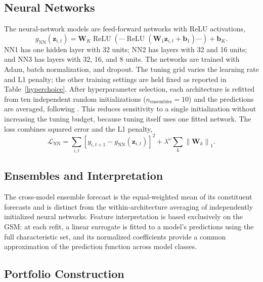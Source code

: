 \documentclass[preprint,12pt,authoryear]{elsarticle}
\begin{document}
\begin{appendices}
\subsection{Neural Networks}

The neural-network models are feed-forward networks with ReLU activations,
\begin{equation}
\label{simplenn}
g_{\mathrm{NN}}(\mathbf{z}_{i,t})=
\mathbf{W}_{K}\operatorname{ReLU}\left(\cdots\operatorname{ReLU}
\left(\mathbf{W}_{1}\mathbf{z}_{i,t}+\mathbf{b}_{1}\right)\cdots\right)+\mathbf{b}_{K}.
\end{equation}
NN1 has one hidden layer with 32 units; NN2 has layers with 32 and 16 units; and NN3 has layers with 32, 16, and 8 units. The networks are trained with Adam, batch normalization, and dropout. The tuning grid varies the learning rate and L1 penalty; the other training settings are held fixed as reported in Table~\ref{hyperchoice}. After hyperparameter selection, each architecture is refitted from ten independent random initializations ($n_{\mathrm{ensembles}}=10$) and the predictions are averaged, following \citet{gukellyxiu2020}. This reduces sensitivity to a single initialization without increasing the tuning budget, because tuning itself uses one fitted network. The loss combines squared error and the L1 penalty,
\begin{equation}
\label{objnn}
\mathcal{L}_{\mathrm{NN}}=
\sum_{i,t}\left[y_{i,t+1}-g_{\mathrm{NN}}(\mathbf{z}_{i,t})\right]^2+
\lambda^{\omega}\sum_k\left\|\mathbf{W}_k\right\|_1.
\end{equation}

\subsection{Ensembles and Interpretation}

The cross-model ensemble forecast is the equal-weighted mean of its constituent forecasts and is distinct from the within-architecture averaging of independently initialized neural networks. Feature interpretation is based exclusively on the GSM: at each refit, a linear surrogate is fitted to a model's predictions using the full characteristic set, and its normalized coefficients provide a common approximation of the prediction function across model classes.

\subsection{Portfolio Construction}


\end{appendices}
\end{document}

